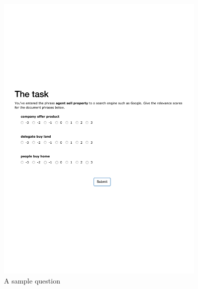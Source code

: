 \begin{figure}
\centering
\includegraphics[width=0.9\textwidth]{figures/task}

\caption{A sample question}

\label{fig:task}
\end{figure}

